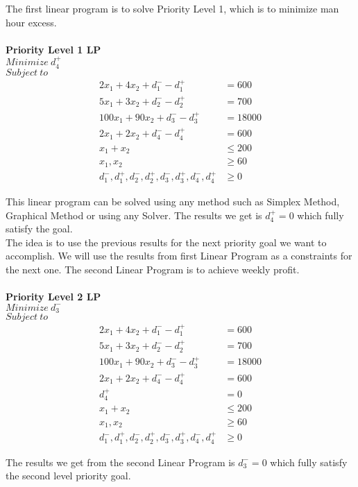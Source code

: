 \documentclass[twoside,twocolumn]{article}
\begin{document}
The first linear program is to solve Priority Level 1, which is to minimize man hour excess.
\\
\\
\textbf{Priority Level 1 LP}\\
$Minimize \ d_4^{+}$ \\
$Subject \ to$
\begin{align*}
2x_1 + 4x_2 + d_1^{-} - d_1^{+} &= 600\\
5x_1 + 3x_2 + d_2^{-} - d_2^{+} &= 700\\
100x_1 + 90x_2 + d_3^{-} - d_3^{+} &= 18000\\
2x_1 + 2x_2 + d_4^{-} - d_4^{+} &= 600 \\
x_1 + x_2 &\leq 200 \\
x_1, x_2 &\geq 60 \\
d_1^{-}, d_1^{+}, d_2^{-}, d_2^{+}, d_3^{-}, d_3^{+}, d_4^{-}, d_4^{+} &\geq 0
\end{align*}

This linear program can be solved using any method such as Simplex Method, Graphical Method or using any Solver. The results we get is $d_4^{+} = 0$ which fully satisfy the goal. \\

The idea is to use the previous results for the next priority goal we want to accomplish. We will use the results from first Linear Program as a constraints for the next one. The second Linear Program is to achieve weekly profit.\\
\\
\textbf{Priority Level 2 LP}\\
$Minimize \ d_3^{-}$ \\
$Subject \ to$
\begin{align*}
2x_1 + 4x_2 + d_1^{-} - d_1^{+} &= 600\\
5x_1 + 3x_2 + d_2^{-} - d_2^{+} &= 700\\
100x_1 + 90x_2 + d_3^{-} - d_3^{+} &= 18000\\
2x_1 + 2x_2 + d_4^{-} - d_4^{+} &= 600 \\
d_4^{+} &= 0 \\
x_1 + x_2 &\leq 200 \\
x_1, x_2 &\geq 60 \\
d_1^{-}, d_1^{+}, d_2^{-}, d_2^{+}, d_3^{-}, d_3^{+}, d_4^{-}, d_4^{+} &\geq 0 
\end{align*}

The results we get from the second Linear Program is $d_3^{-} = 0$ which fully satisfy the second level priority goal. \\
\end{document}
